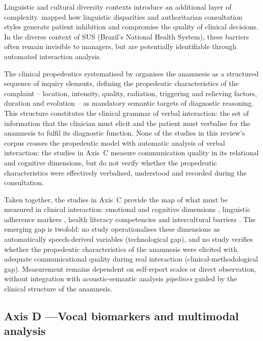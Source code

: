 \documentclass[review,12pt]{elsarticle}
\begin{document}
Linguistic and cultural diversity contexts introduce an additional layer of
complexity. \citet{Alkhamees2023} mapped how linguistic disparities and
authoritarian consultation styles generate patient inhibition and compromise
the quality of clinical decisions. In the diverse context of SUS (Brazil's
National Health System), these barriers often remain invisible to managers,
but are potentially identifiable through automated interaction analysis.

The clinical propedeutics systematised by \citet{Porto2019} organises the
anamnesis as a structured sequence of inquiry elements, defining the
propedeutic characteristics of the complaint -- location, intensity, quality,
radiation, triggering and relieving factors, duration and evolution -- as
mandatory semantic targets of diagnostic reasoning. This structure constitutes
the clinical grammar of verbal interaction: the set of information that the
clinician must elicit and the patient must verbalise for the anamnesis to
fulfil its diagnostic function. None of the studies in this review's corpus
crosses the propedeutic model with automatic analysis of verbal interaction:
the studies in Axis~C measure communication quality in its relational and
cognitive dimensions, but do not verify whether the propedeutic characteristics
were effectively verbalised, understood and recorded during the consultation.

Taken together, the studies in Axis~C provide the map of what must be measured
in clinical interaction: emotional and cognitive dimensions
\citep{Kelley2014,Shao2025}, linguistic adherence markers
\citep{McCabe2018,Rucinski2022}, health literacy competencies
\citep{Muscat2020} and intercultural barriers \citep{Alkhamees2023}. The
emerging gap is twofold: no study operationalises these dimensions as
automatically speech-derived variables (technological gap), and no study
verifies whether the propedeutic characteristics of the anamnesis
\citep{Porto2019} were elicited with adequate communicational quality during
real interaction (clinical-methodological gap). Measurement remains dependent
on self-report scales or direct observation, without integration with
acoustic-semantic analysis \textit{pipelines} guided by the clinical structure
of the anamnesis.

\subsection{Axis D —Vocal biomarkers and multimodal analysis}
\label{subsec:eixoD}
\end{document}

